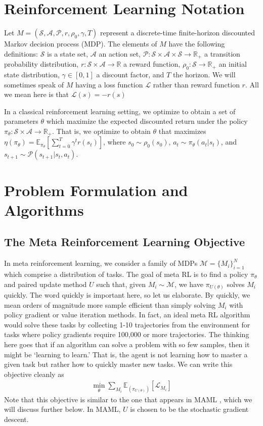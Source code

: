 \documentclass{article} %
\newcommand{\sset}{\mathcal{S}}
\newcommand{\aset}{\mathcal{A}}
\newcommand{\trans}{\mathcal{P}}
\begin{document}
\section{Reinforcement Learning Notation}
Let $M = (\sset, \aset, \trans, r, \rho_0, \gamma, T)$ represent a discrete-time finite-horizon discounted Markov decision process (MDP). The elements of $M$ have the following definitions: $\sset$ is a state set, $\aset$ an action set, $\trans: \sset \times \aset \times \sset \rightarrow \mathbb{R}_{+}$ a transition probability distribution, $r: \sset \times \aset \rightarrow \mathbb{R}$ a reward function, $\rho_0: \sset \to \mathbb{R}_+$ an initial state distribution, $\gamma \in [0, 1]$ a discount factor, and $T$ the horizon. We will sometimes speak of $M$ having a loss function $\mathcal{L}$ rather than reward function $r$. All we mean here is that $\mathcal{L}(s) = -r(s)$

In a classical reinforcement learning setting, we optimize to obtain a set of parameters $\theta$ which maximize the expected discounted return under the policy $\pi_{\theta}: \sset \times \aset \to \mathbb{R}_+$. That is, we optimize to obtain $\theta$ that maximizes $\eta(\pi_\theta) = \mathbb{E}_{\pi_\theta}[ \sum_{t=0}^T \gamma^t r(s_t) ]$, where $\displaystyle s_0 \sim \rho_0(s_0)$, $a_t \sim \pi_\theta(a_t|s_t)$, and $s_{t+1} \sim \trans(s_{t+1} | s_t, a_t)$.   %



\section{Problem Formulation and Algorithms}

\subsection{The Meta Reinforcement Learning Objective}
In meta reinforcement learning, we consider a family of MDPs $\mathcal{M} = \{M_i \}_{i=1}^N$ which comprise a distribution of tasks. The goal of meta RL is to find a policy $\pi_\theta$ and paired update method $U$ such that, given $M_i \sim \mathcal{M}$, we have $\pi_{U(\theta)}$ solves $M_i$ quickly. The word quickly is important here, so let us elaborate. By quickly, we mean orders of magnitude more sample efficient than simply solving $M_i$ with policy gradient or value iteration methods. In fact, an ideal meta RL algorithm would solve these tasks by collecting 1-10 trajectories from the environment for tasks where policy gradients require 100,000 or more trajectories. The thinking here goes that if an algorithm can solve a problem with so few samples, then it might be `learning to learn.' That is, the agent is not learning how to master a given task but rather how to quickly master new tasks. We can write this objective cleanly as 
\begin{align}
    \min_\theta \sum_{M_i} \mathbb{E}_{(\pi_{U(\theta)})} \left[ \mathcal{L}_{M_i} \right]
    \label{eq:objective}
\end{align}
Note that this objective is similar to the one that appears in MAML \cite{maml}, which we will discuss further below. In MAML, $U$ is chosen to be the stochastic gradient descent.
\end{document}
